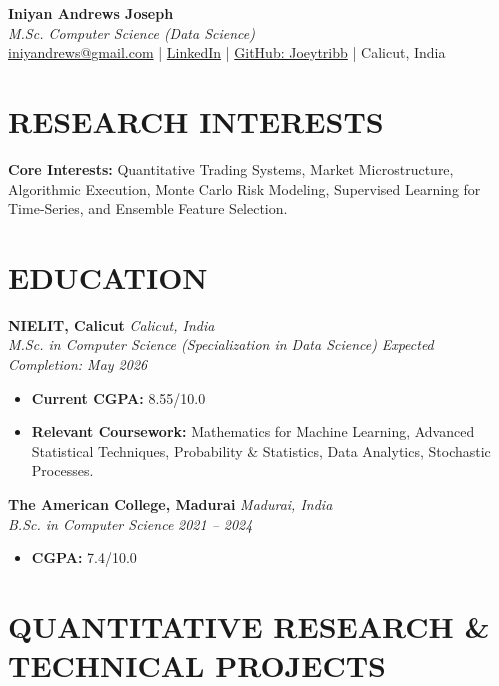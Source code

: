 \documentclass[10pt, letterpaper]{article}
\begin{document}
\begin{center}
    {\Huge \textbf{Iniyan Andrews Joseph}} \\ \vspace{4pt}
    {\textit{M.Sc. Computer Science (Data Science)}} \\ \vspace{4pt}
    \href{mailto:iniyandrews@gmail.com}{iniyandrews@gmail.com} \quad|\quad
    \href{https://www.linkedin.com/in/iniyandrews}{LinkedIn} \quad|\quad
    \href{https://github.com/Joeytribb}{GitHub: Joeytribb} \quad|\quad
    Calicut, India
\end{center}

\section*{RESEARCH INTERESTS}
\textbf{Core Interests:} Quantitative Trading Systems, Market Microstructure, Algorithmic Execution, Monte Carlo Risk Modeling, Supervised Learning for Time-Series, and Ensemble Feature Selection.

\section*{EDUCATION}
\noindent \textbf{NIELIT, Calicut} \hfill \textit{Calicut, India} \\
\textit{M.Sc. in Computer Science (Specialization in Data Science)} \hfill \textit{Expected Completion: May 2026}
\begin{itemize}[leftmargin=*, noitemsep, topsep=0pt]
    \item \textbf{Current CGPA:} 8.55/10.0
    \item \textbf{Relevant Coursework:} Mathematics for Machine Learning, Advanced Statistical Techniques, Probability \& Statistics, Data Analytics, Stochastic Processes.
\end{itemize}
\vspace{6pt}
\noindent \textbf{The American College, Madurai} \hfill \textit{Madurai, India} \\
\textit{B.Sc. in Computer Science} \hfill \textit{2021 -- 2024}
\begin{itemize}[leftmargin=*, noitemsep, topsep=0pt]
    \item \textbf{CGPA:} 7.4/10.0
\end{itemize}

\section*{QUANTITATIVE RESEARCH \& TECHNICAL PROJECTS}
\end{document}
